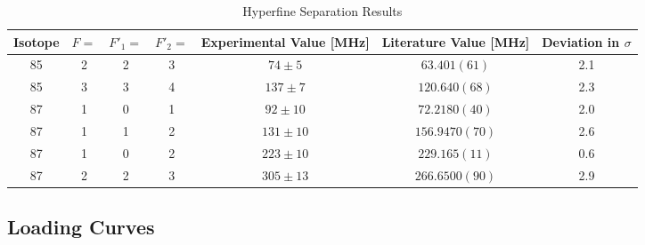 \documentclass[12pt, a4paper]{article}
\begin{document}
\begin{table}[htb]
\begin{center}
\caption{Hyperfine Separation Results\protect\footnotemark}
\vspace{4mm}
\begin{tabular}{|c|c|c|c|c|c|c|}\hline
Isotope     & $F =$  & $F'_1 =$   & $F'_2 =$   & Experimental Value [MHz]   & Literature Value [MHz]     & Deviation in $\sigma$ \\\hline
85          & 2      & 2          & 3          & $74 \pm 5$                 & $63.401(61)$               & 2.1\\
85          & 3      & 3          & 4          & $137 \pm 7$                & $120.640(68)$              & 2.3\\
87          & 1      & 0          & 1          & $92 \pm 10$                & $72.2180(40)$              & 2.0\\
87          & 1      & 1          & 2          & $131 \pm 10$               & $156.9470(70)$             & 2.6\\
87          & 1      & 0          & 2          & $223 \pm 10$               & $229.165(11)$              & 0.6\\
87          & 2      & 2          & 3          & $305 \pm 13$               & $266.6500(90)$             & 2.9\\\hline
\end{tabular}

\end{center}
\end{table}



\newpage


\subsection{Loading Curves}
\end{document}
